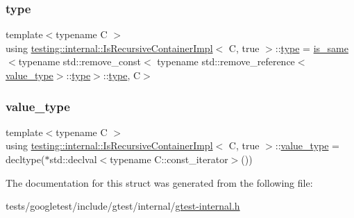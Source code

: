 \subsubsection{\texorpdfstring{type}{type}}
{\footnotesize\ttfamily template$<$typename C $>$ \\
using \hyperlink{structtesting_1_1internal_1_1IsRecursiveContainerImpl}{testing\+::internal\+::\+Is\+Recursive\+Container\+Impl}$<$ C, true $>$\+::\hyperlink{structtesting_1_1internal_1_1IsRecursiveContainerImpl_3_01C_00_01true_01_4_a24b611fbe1b9a7c524ee54ae01324388}{type} =  \hyperlink{structtesting_1_1internal_1_1is__same}{is\+\_\+same}$<$typename std\+::remove\+\_\+const$<$ typename std\+::remove\+\_\+reference$<$\hyperlink{structtesting_1_1internal_1_1IsRecursiveContainerImpl_3_01C_00_01true_01_4_a5e8e2cf58f0d2581e9e3ab5f5630cd61}{value\+\_\+type}$>$\+::\hyperlink{structtesting_1_1internal_1_1IsRecursiveContainerImpl_3_01C_00_01true_01_4_a24b611fbe1b9a7c524ee54ae01324388}{type}$>$\+::\hyperlink{structtesting_1_1internal_1_1IsRecursiveContainerImpl_3_01C_00_01true_01_4_a24b611fbe1b9a7c524ee54ae01324388}{type}, C$>$}

\mbox{\label{structtesting_1_1internal_1_1IsRecursiveContainerImpl_3_01C_00_01true_01_4_a5e8e2cf58f0d2581e9e3ab5f5630cd61}} 
\subsubsection{\texorpdfstring{value\+\_\+type}{value\_type}}
{\footnotesize\ttfamily template$<$typename C $>$ \\
using \hyperlink{structtesting_1_1internal_1_1IsRecursiveContainerImpl}{testing\+::internal\+::\+Is\+Recursive\+Container\+Impl}$<$ C, true $>$\+::\hyperlink{structtesting_1_1internal_1_1IsRecursiveContainerImpl_3_01C_00_01true_01_4_a5e8e2cf58f0d2581e9e3ab5f5630cd61}{value\+\_\+type} =  decltype($\ast$std\+::declval$<$typename C\+::const\+\_\+iterator$>$())}



The documentation for this struct was generated from the following file\+:\begin{DoxyCompactItemize}
\item 
tests/googletest/include/gtest/internal/\hyperlink{gtest-internal_8h}{gtest-\/internal.\+h}\end{DoxyCompactItemize}
